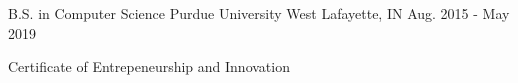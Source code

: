 

\begin{cventries}
  \cventry
    {B.S. in Computer Science} %
    {Purdue University} %
    {West Lafayette, IN} %
    {Aug. 2015 - May 2019} %
    {
      \begin{cvitems} %
        \item {Certificate of Entrepeneurship and Innovation}
      \end{cvitems}
    }

\end{cventries}
